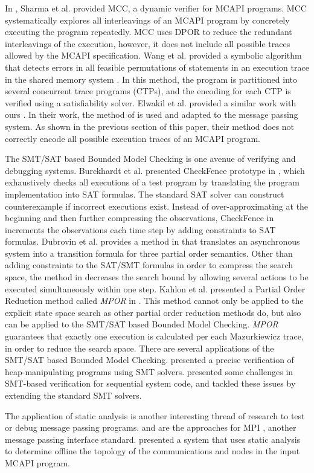 In \cite{sharma:fmcad09}, Sharma et al. provided MCC, a dynamic verifier for MCAPI programs. MCC systematically explores all interleavings of an MCAPI program by concretely executing the program repeatedly. MCC uses DPOR \cite{flanagan:popl05} to reduce the redundant interleavings of the execution, however, it does not include all possible traces allowed by the MCAPI specification. Wang et al. provided a symbolic algorithm that detects errors in all feasible permutations of statements in an execution trace in the shared memory system \cite{wang:fse09}. In this method, the program is partitioned into several concurrent trace programs (CTPs), and the encoding for each CTP is verified using a satisfiability solver. Elwakil et al. provided a similar work with ours \cite{elwakil:atva10,elwakil:padtad10}. In their work, the method of \cite{wang:fse09} is used and adapted to the message passing system. As shown in the previous section of this paper, their method does not correctly encode all possible execution traces of an MCAPI program.

The SMT/SAT based Bounded Model Checking is one avenue of verifying and debugging systems. Burckhardt et al. presented CheckFence prototype in \cite{burckhardt:pldi07}, which exhaustively checks all executions of a test program by translating the program implementation into SAT formulas. The standard SAT solver can construct counterexample if incorrect executions exist. Instead of over-approximating at the beginning and then further compressing the observations, CheckFence in \cite{burckhardt:pldi07} increments the observations each time step by adding constraints to SAT formulas. Dubrovin et al. provides a method in \cite{heljanko:scp} that translates an asynchronous system into a transition formula for three partial order semantics. Other than adding constraints to the SAT/SMT formulas in order to compress the search space, the method in \cite{heljanko:scp} decreases the search bound by allowing several actions to be executed simultaneously within one step. Kahlon et al. presented a Partial Order Reduction method called \textit{MPOR} in \cite{kahlon:cav09}. This method cannot only be applied to the explicit state space search as other partial order reduction methods do, but also can be applied to the SMT/SAT based Bounded Model Checking. \textit{MPOR} guarantees that exactly one execution is calculated per each Mazurkiewicz trace, in order to reduce the search space. There are several applications of the SMT/SAT based Bounded Model Checking. \cite{lahiri:popl08} presented a precise verification of heap-manipulating programs using SMT solvers. \cite{lahiri:cav11} presented some challenges in SMT-based verification for sequential system code, and tackled these issues by extending the standard SMT solvers.

The application of static analysis is another interesting thread of research to test or debug message passing programs. \cite{zhang:ppopp07} and \cite{greg:cgo09} are the approaches for MPI \cite{mpi}, another message passing interface standard. \cite{gray:lctes11} presented a system that uses static analysis to determine offline the topology of the communications and nodes in the input MCAPI program.

